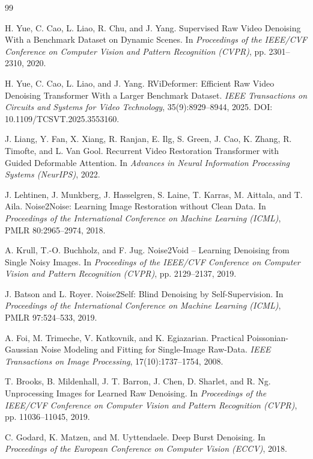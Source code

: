 \documentclass[11pt,a4paper,UTF8,fontset=fandol]{ctexart}
\begin{document}
\begin{thebibliography}{99}

 H. Yue, C. Cao, L. Liao, R. Chu, and J. Yang. Supervised Raw Video Denoising With a Benchmark Dataset on Dynamic Scenes. In \emph{Proceedings of the IEEE/CVF Conference on Computer Vision and Pattern Recognition (CVPR)}, pp. 2301--2310, 2020.

 H. Yue, C. Cao, L. Liao, and J. Yang. RViDeformer: Efficient Raw Video Denoising Transformer With a Larger Benchmark Dataset. \emph{IEEE Transactions on Circuits and Systems for Video Technology}, 35(9):8929--8944, 2025. DOI: 10.1109/TCSVT.2025.3553160.

 J. Liang, Y. Fan, X. Xiang, R. Ranjan, E. Ilg, S. Green, J. Cao, K. Zhang, R. Timofte, and L. Van Gool. Recurrent Video Restoration Transformer with Guided Deformable Attention. In \emph{Advances in Neural Information Processing Systems (NeurIPS)}, 2022.

 J. Lehtinen, J. Munkberg, J. Hasselgren, S. Laine, T. Karras, M. Aittala, and T. Aila. Noise2Noise: Learning Image Restoration without Clean Data. In \emph{Proceedings of the International Conference on Machine Learning (ICML)}, PMLR 80:2965--2974, 2018.

 A. Krull, T.-O. Buchholz, and F. Jug. Noise2Void -- Learning Denoising from Single Noisy Images. In \emph{Proceedings of the IEEE/CVF Conference on Computer Vision and Pattern Recognition (CVPR)}, pp. 2129--2137, 2019.

 J. Batson and L. Royer. Noise2Self: Blind Denoising by Self-Supervision. In \emph{Proceedings of the International Conference on Machine Learning (ICML)}, PMLR 97:524--533, 2019.

 A. Foi, M. Trimeche, V. Katkovnik, and K. Egiazarian. Practical Poissonian-Gaussian Noise Modeling and Fitting for Single-Image Raw-Data. \emph{IEEE Transactions on Image Processing}, 17(10):1737--1754, 2008.

 T. Brooks, B. Mildenhall, J. T. Barron, J. Chen, D. Sharlet, and R. Ng. Unprocessing Images for Learned Raw Denoising. In \emph{Proceedings of the IEEE/CVF Conference on Computer Vision and Pattern Recognition (CVPR)}, pp. 11036--11045, 2019.

 C. Godard, K. Matzen, and M. Uyttendaele. Deep Burst Denoising. In \emph{Proceedings of the European Conference on Computer Vision (ECCV)}, 2018.


\end{thebibliography}
\end{document}
